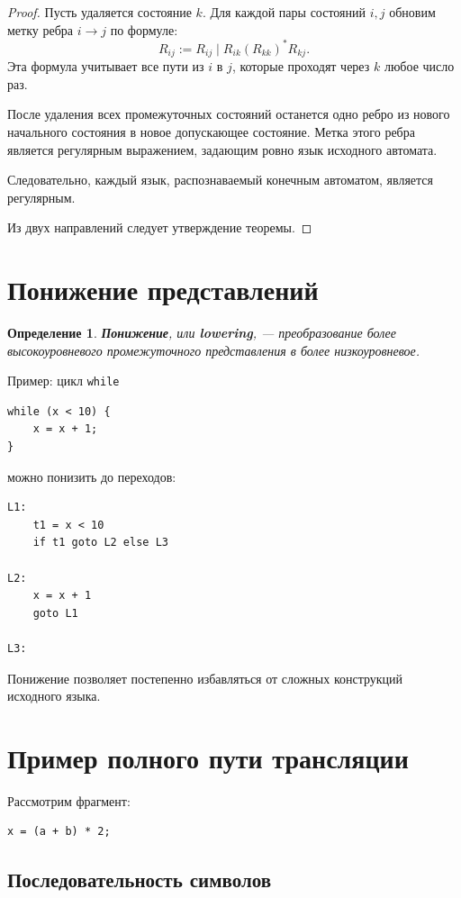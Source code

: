 \documentclass[12pt,a4paper]{article}
\newtheorem{definition}{Определение}
\begin{document}
\begin{proof}
Пусть удаляется состояние $k$. Для каждой пары состояний $i,j$ обновим метку ребра $i\to j$ по формуле:
\[
R_{ij} := R_{ij} \mid R_{ik}(R_{kk})^*R_{kj}.
\]
Эта формула учитывает все пути из $i$ в $j$, которые проходят через $k$ любое число раз.

После удаления всех промежуточных состояний останется одно ребро из нового начального состояния в новое допускающее состояние. Метка этого ребра является регулярным выражением, задающим ровно язык исходного автомата.

Следовательно, каждый язык, распознаваемый конечным автоматом, является регулярным.

Из двух направлений следует утверждение теоремы.
\end{proof}

\section{Понижение представлений}

\begin{definition}
\textbf{Понижение}, или \textbf{lowering}, --- преобразование более высокоуровневого промежуточного представления в более низкоуровневое.
\end{definition}

Пример: цикл \texttt{while}

\begin{lstlisting}
while (x < 10) {
    x = x + 1;
}
\end{lstlisting}

можно понизить до переходов:

\begin{lstlisting}
L1:
    t1 = x < 10
    if t1 goto L2 else L3

L2:
    x = x + 1
    goto L1

L3:
\end{lstlisting}

Понижение позволяет постепенно избавляться от сложных конструкций исходного языка.

\section{Пример полного пути трансляции}

Рассмотрим фрагмент:

\begin{lstlisting}
x = (a + b) * 2;
\end{lstlisting}

\subsection{Последовательность символов}
\end{document}
